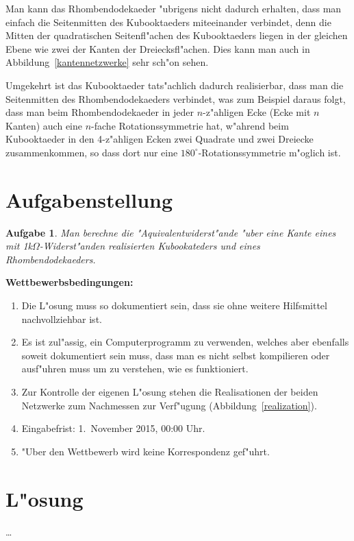 \documentclass[a4paper,12pt]{article}
\begin{document}
Man kann das Rhombendodekaeder "ubrigens nicht dadurch erhalten, dass man
einfach die Seitenmitten des Kubooktaeders miteeinander verbindet, denn die
Mitten der quadratischen Seitenfl"achen des Kubooktaeders liegen in der
gleichen Ebene wie zwei der Kanten der Dreiecksfl"achen.
Dies kann man auch in Abbildung~\ref{kantennetzwerke} sehr sch"on sehen.

Umgekehrt ist das Kubooktaeder tats"achlich dadurch realisierbar, dass
man die Seitenmitten des Rhombendodekaeders verbindet, was zum Beispiel
daraus folgt, dass man beim Rhombendodekaeder in jeder $n$-z"ahligen
Ecke (Ecke mit $n$ Kanten) auch eine $n$-fache Rotationssymmetrie hat,
w"ahrend beim Kubooktaeder in den 4-z"ahligen Ecken zwei Quadrate
und zwei Dreiecke zusammenkommen, so dass dort nur eine
$180^\circ$-Rotationssymmetrie m"oglich ist.

\section{Aufgabenstellung}

\newtheorem{aufgabe}{Aufgabe}
\begin{aufgabe}
Man berechne die "Aquivalentwiderst"ande "uber eine Kante eines mit
1k$\Omega$-Widerst"anden realisierten Kubookateders und eines Rhombendodekaeders.
\end{aufgabe}

{\parindent0pt \bf Wettbewerbsbedingungen:}
\begin{enumerate}
\item
Die L"osung muss so dokumentiert sein, dass sie ohne weitere Hilfsmittel
nachvollziehbar ist.
\item
Es ist zul"assig, ein Computerprogramm zu verwenden, welches aber ebenfalls
soweit dokumentiert sein muss, dass man es nicht selbst kompilieren oder
ausf"uhren muss um zu verstehen, wie es funktioniert.
\item
Zur Kontrolle der eigenen L"osung stehen die Realisationen der beiden
Netzwerke zum Nachmessen zur Verf"ugung (Abbildung~\ref{realization}).
\item
Eingabefrist: 1.~November 2015, 00:00 Uhr.
\item
"Uber den Wettbewerb wird keine Korrespondenz gef"uhrt.
\end{enumerate}

\section{L"osung}
\dots
\end{document}

